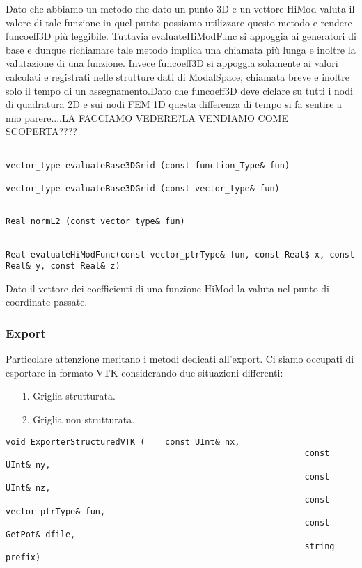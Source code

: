 Dato che abbiamo un metodo che dato un punto 3D e un vettore HiMod valuta il valore di tale funzione in quel punto possiamo utilizzare questo metodo e rendere funcoeff3D pi\`u leggibile.
Tuttavia evaluateHiModFunc si appoggia ai generatori di base e dunque richiamare tale metodo implica una chiamata pi\`u lunga e inoltre la valutazione di una funzione.
Invece funcoeff3D si appoggia solamente ai valori calcolati e registrati nelle strutture dati di ModalSpace, chiamata breve e inoltre solo il tempo di un assegnamento.Dato che funcoeff3D deve ciclare su tutti i nodi di quadratura 2D e sui nodi FEM 1D questa differenza di tempo si fa sentire a mio parere....LA FACCIAMO VEDERE?LA VENDIAMO COME SCOPERTA????

\begin{lstlisting}[style = general]

vector_type evaluateBase3DGrid (const function_Type& fun)

vector_type evaluateBase3DGrid (const vector_type& fun)

\end{lstlisting}

\begin{lstlisting}[style = general]

Real normL2 (const vector_type& fun)

\end{lstlisting}

\begin{lstlisting}[style = general, frame = top]

Real evaluateHiModFunc(const vector_ptrType& fun, const Real$ x, const Real& y, const Real& z)
\end{lstlisting}

Dato il vettore dei coefficienti di una funzione HiMod la valuta nel punto di coordinate passate.


\subsubsection{Export}

Particolare attenzione meritano i metodi dedicati all'export. Ci siamo occupati di esportare in formato VTK considerando due situazioni differenti:
\begin{itemize}
\item[1.] Griglia strutturata.
\item[2.] Griglia non strutturata.
\end{itemize}

\begin{lstlisting}[style = general]
void ExporterStructuredVTK (	const UInt& nx,
															const UInt& ny,
															const UInt& nz,
															const vector_ptrType& fun,
															const GetPot& dfile, 
															string prefix)
\end{lstlisting}

